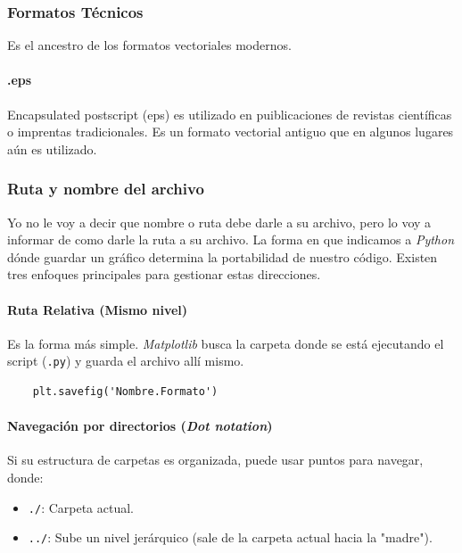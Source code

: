 \subsubsection{Formatos Técnicos}

Es el ancestro de los formatos vectoriales modernos.

\paragraph{.eps}

Encapsulated postscript (eps) es utilizado en puiblicaciones de revistas científicas o imprentas tradicionales. Es un formato vectorial antiguo que en algunos lugares aún es utilizado.





\subsubsection{Ruta y nombre del archivo}

Yo no le voy a decir que nombre o ruta debe darle a su archivo, pero lo voy a informar de como darle la ruta a su archivo. La forma en que indicamos a \textit{Python} dónde guardar un gráfico determina la portabilidad de nuestro código. Existen tres enfoques principales para gestionar estas direcciones.

\paragraph{Ruta Relativa (Mismo nivel)}

Es la forma más simple. \textit{Matplotlib} busca la carpeta donde se está ejecutando el script (\texttt{.py}) y guarda el archivo allí mismo.
\begin{verbatim}
    plt.savefig('Nombre.Formato')
\end{verbatim}


\paragraph{Navegación por directorios (\textit{Dot notation})}

Si su estructura de carpetas es organizada, puede usar puntos para navegar, donde:
\begin{itemize}
\item \texttt{./}: Carpeta actual.
\item \texttt{../}: Sube un nivel jerárquico (sale de la carpeta actual hacia la "madre").
\end{itemize}

